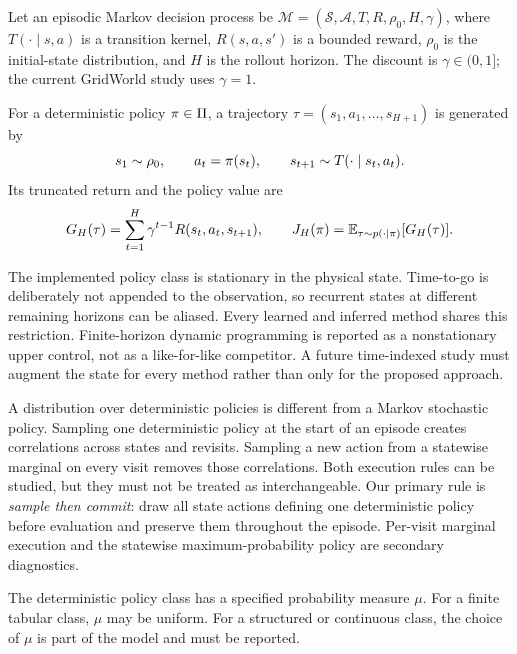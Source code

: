 \label{sec:foundations}


Let an episodic Markov decision process be
\(\mathcal{M}=(\mathcal{S},\mathcal{A},T,R,\rho_0,H,\gamma)\), where
\(T(\cdot\mid s,a)\) is a transition kernel, \(R(s,a,s')\) is a bounded
reward, \(\rho_0\) is the initial-state distribution, and \(H\) is the rollout
horizon.  The discount is \(\gamma\in(0,1]\); the current GridWorld study uses
\(\gamma=1\).

For a deterministic policy \(\pi\in\Pi\), a trajectory
\(\tau=(s_1,a_1,\ldots,s_{H+1})\) is generated by
\[
  s_1\sim\rho_0,\qquad
  a_t=\pi(s_t),\qquad
  s_{t+1}\sim T(\cdot\mid s_t,a_t).
\]
Its truncated return and the policy value are
\begin{equation}
  G_H(\tau)=\sum_{t=1}^{H}\gamma^{t-1}R(s_t,a_t,s_{t+1}),
  \qquad
  J_H(\pi)=\mathbb{E}_{\tau\sim p(\cdot\mid\pi)}
  [G_H(\tau)].
  \label{eq:return-value}
\end{equation}

The implemented policy class is stationary in the physical state.  Time-to-go
is deliberately not appended to the observation, so recurrent states at
different remaining horizons can be aliased.  Every learned and inferred
method shares this restriction.  Finite-horizon dynamic programming is reported
as a nonstationary upper control, not as a like-for-like competitor.  A future
time-indexed study must augment the state for every method rather than only for
the proposed approach.


A distribution over deterministic policies is different from a Markov
stochastic policy. Sampling one deterministic policy at the start of an episode
creates correlations across states and revisits. Sampling a new action from a
statewise marginal on every visit removes those correlations. Both execution
rules can be studied, but they must not be treated as interchangeable.  Our
primary rule is \emph{sample then commit}: draw all state actions defining one
deterministic policy before evaluation and preserve them throughout the
episode.  Per-visit marginal execution and the statewise maximum-probability
policy are secondary diagnostics.

\begin{assumption}
The deterministic policy class has a specified probability measure
\(\mu\). For a finite tabular class, \(\mu\) may be uniform. For a structured
or continuous class, the choice of \(\mu\) is part of the model and must be
reported.
\end{assumption}
